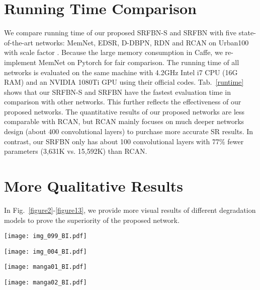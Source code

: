 \documentclass[10pt,twocolumn,letterpaper]{article}
\begin{document}
\section{Running Time Comparison}
 We compare running time of our proposed SRFBN-S and SRFBN with five state-of-the-art networks: MemNet\cite{tai2017memnet}, EDSR\cite{lim2017enhanced}, D-DBPN\cite{Haris_2018_CVPR}, RDN\cite{Zhang_2018_CVPR} and RCAN\cite{zhang2018rcan} on Urban100 with scale factor . Because the large memory consumption in Caffe, we re-implement MemNet on Pytorch for fair comparison. The running time of all networks is evaluated on the same machine with 4.2GHz Intel i7 CPU (16G RAM) and an NVIDIA 1080Ti GPU using their official codes. Tab.~\ref{runtime} shows that our SRFBN-S and SRFBN have the fastest evaluation time in comparison with other networks. This further reflects the effectiveness of our proposed networks. The quantitative results of our proposed networks are less comparable with RCAN, but RCAN mainly focuses on much deeper networks design (about 400 convolutional layers) to purchase more accurate SR results. In contrast, our SRFBN only has about 100 convolutional layers with 77\% fewer parameters (3,631K vs. 15,592K) than RCAN.


\section{More Qualitative Results}
In Fig.~\ref{figure2}-\ref{figure13}, we provide more visual results of different degradation models to prove the superiority of the proposed network.



\begin{figure*}[h]
	\centering
	\texttt{[image: img\_099\_BI.pdf]}
	\caption{Visual results of \textbf{BI} degradation model with scale factor .}\label{figure2}
\end{figure*}
\begin{figure*}[h]
	\centering
	\texttt{[image: img\_004\_BI.pdf]}
	\caption{Visual results of \textbf{BI} degradation model with scale factor .}\end{figure*}
\begin{figure*}[h]
	\centering
	\texttt{[image: manga01\_BI.pdf]}
	\caption{Visual results of \textbf{BI} degradation model with scale factor .}\end{figure*}
\begin{figure*}[h]
	\centering
	\texttt{[image: manga02\_BI.pdf]}
	\caption{Visual results of \textbf{BI} degradation model with scale factor .}\end{figure*}
\end{document}
